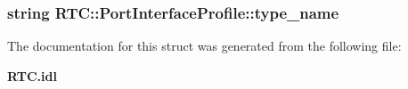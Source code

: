 \subsubsection{\setlength{\rightskip}{0pt plus 5cm}string {\bf RTC::Port\-Interface\-Profile::type\_\-name}}\label{structRTC_1_1PortInterfaceProfile_RTC_1_1PortInterfaceProfileo1}




The documentation for this struct was generated from the following file:\begin{CompactItemize}
\item 
{\bf RTC.idl}\end{CompactItemize}
